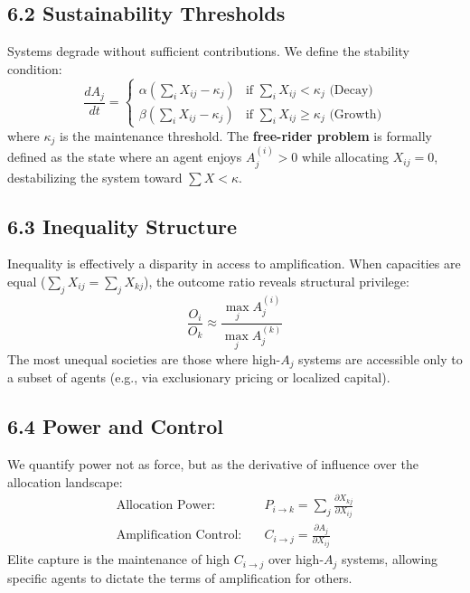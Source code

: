 \documentclass{article}
\begin{document}
\subsection*{6.2 Sustainability Thresholds}
Systems degrade without sufficient contributions. We define the stability condition:
\begin{equation}
\frac{dA_j}{dt} = 
\begin{cases}
\alpha \left( \sum_i X_{ij} - \kappa_j \right) & \text{if } \sum_i X_{ij} < \kappa_j \text{ (Decay)} \\
\beta \left( \sum_i X_{ij} - \kappa_j \right) & \text{if } \sum_i X_{ij} \geq \kappa_j \text{ (Growth)}
\end{cases}
\end{equation}
where $\kappa_j$ is the maintenance threshold. The \textbf{free-rider problem} is formally defined as the state where an agent enjoys $A_j^{(i)} > 0$ while allocating $X_{ij} = 0$, destabilizing the system toward $\sum X < \kappa$.

\subsection*{6.3 Inequality Structure}
Inequality is effectively a disparity in access to amplification. When capacities are equal ($\sum_j X_{ij} = \sum_j X_{kj}$), the outcome ratio reveals structural privilege:
\begin{equation}
\frac{O_i}{O_k} \approx \frac{\max_j A_j^{(i)}}{\max_j A_j^{(k)}}
\end{equation}
The most unequal societies are those where high-$A_j$ systems are accessible only to a subset of agents (e.g., via exclusionary pricing or localized capital).

\subsection*{6.4 Power and Control}
We quantify power not as force, but as the derivative of influence over the allocation landscape:
\begin{align}
\text{Allocation Power:} \quad & P_{i \to k} = \sum_j \frac{\partial X_{kj}}{\partial X_{ij}} \\
\text{Amplification Control:} \quad & C_{i \to j} = \frac{\partial A_j}{\partial X_{ij}}
\end{align}
Elite capture is the maintenance of high $C_{i \to j}$ over high-$A_j$ systems, allowing specific agents to dictate the terms of amplification for others.
\end{document}
